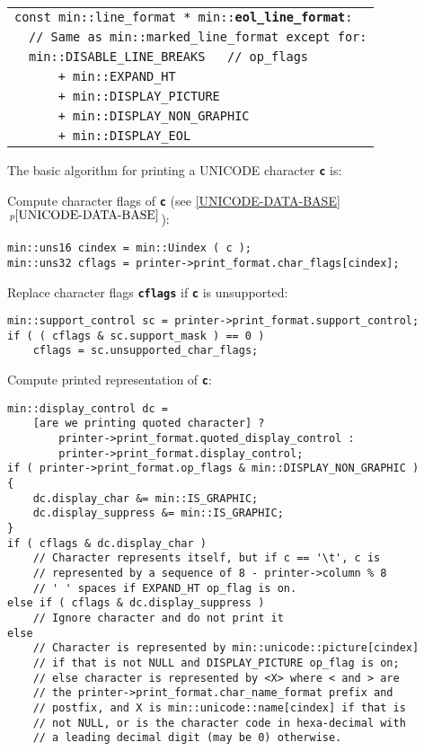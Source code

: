 \documentclass[12pt]{article}
\makeatletter
\newcommand{\TT}[1]{{\tt \bfseries #1}}
\newcommand{\ttindex}[1]{\index{#1@{\tt #1}}}
\newcommand{\itemref}[1]{\ref{#1}$\,^{p\pageref{#1}}$}
\newenvironment{indpar}[1][0.3in]%
	{\begin{list}{}%
		     {\setlength{\itemsep}{0in}%
		      \setlength{\topsep}{0in}%
		      \setlength{\parsep}{1ex}%
		      \setlength{\labelwidth}{#1}%
		      \setlength{\leftmargin}{#1}%
		      \addtolength{\leftmargin}{\labelsep}}%
	 \item}%
	{\end{list}}
\newcommand{\LABEL}[1]{\label{#1}}
\newlength{\ARGBREAKLENGTH}
\newcommand{\ARGBREAK}[1][\ARGBREAKLENGTH]{\\&\hspace*{#1}}
\newcommand{\MINKEY}[1]%
	   {\TT{#1}\ttindex{min::#1}\ttindex{#1}}
\makeatother
\begin{document}
\begin{indpar}[1em]\begin{tabular}{rl}
\multicolumn{2}{l}{\tt const min::line\_format *
    min::\MINKEY{eol\_line\_format}:}
\LABEL{MIN::EOL_LINE_FORMAT}\ARGBREAK
\verb|// Same as min::marked_line_format except for:|\ARGBREAK
\verb|min::DISABLE_LINE_BREAKS   // op_flags|\ARGBREAK
\verb|    + min::EXPAND_HT|\ARGBREAK
\verb|    + min::DISPLAY_PICTURE|\ARGBREAK
\verb|    + min::DISPLAY_NON_GRAPHIC|\ARGBREAK
\verb|    + min::DISPLAY_EOL|
\end{tabular}\end{indpar}

The basic algorithm for printing a UNICODE character \TT{c} is:

\begin{enumerate}

\item Compute character flags of \TT{c} (see \itemref{UNICODE-DATA-BASE}):%
\label{COMPUTE-CHARACTER-FLAGS}
\begin{indpar}\begin{verbatim}
min::uns16 cindex = min::Uindex ( c );
min::uns32 cflags = printer->print_format.char_flags[cindex];
\end{verbatim}\end{indpar}

\item Replace character flags \TT{cflags} if \TT{c} is unsupported:%
\label{REPLACE-CHARACTER-FLAGS}
\begin{indpar}\begin{verbatim}
min::support_control sc = printer->print_format.support_control;
if ( ( cflags & sc.support_mask ) == 0 )
    cflags = sc.unsupported_char_flags;
\end{verbatim}\end{indpar}

\item Compute printed representation of \TT{c}:%
\label{COMPUTE-PRINTED-REPRESENTATION}
\begin{indpar}\begin{verbatim}
min::display_control dc =
    [are we printing quoted character] ?
        printer->print_format.quoted_display_control :
        printer->print_format.display_control;
if ( printer->print_format.op_flags & min::DISPLAY_NON_GRAPHIC )
{
    dc.display_char &= min::IS_GRAPHIC;
    dc.display_suppress &= min::IS_GRAPHIC;
}
if ( cflags & dc.display_char )
    // Character represents itself, but if c == '\t', c is
    // represented by a sequence of 8 - printer->column % 8
    // ' ' spaces if EXPAND_HT op_flag is on.
else if ( cflags & dc.display_suppress )
    // Ignore character and do not print it
else
    // Character is represented by min::unicode::picture[cindex]
    // if that is not NULL and DISPLAY_PICTURE op_flag is on;
    // else character is represented by <X> where < and > are
    // the printer->print_format.char_name_format prefix and
    // postfix, and X is min::unicode::name[cindex] if that is
    // not NULL, or is the character code in hexa-decimal with
    // a leading decimal digit (may be 0) otherwise.
\end{verbatim}\end{indpar}


\end{enumerate}
\end{document}
